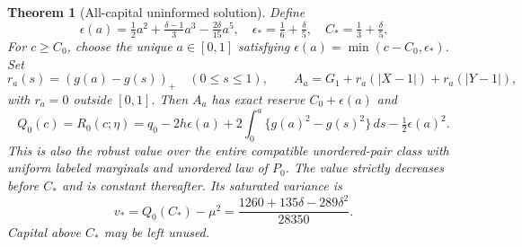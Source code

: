 \documentclass[11pt,a4paper]{amsart}
\theoremstyle{plain}
\newtheorem{theorem}{Theorem}[section]
\theoremstyle{definition}
\theoremstyle{remark}
\begin{document}
\begin{theorem}[All-capital uninformed solution]\label{thm:allcapital}
Define
\begin{equation}\label{eq:aparam}
 \epsilon(a)=\tfrac12a^2+\tfrac{\delta-1}{3}a^3-\tfrac{2\delta}{15}a^5,
 \quad \epsilon_* =\tfrac16+\tfrac\delta5,
 \quad C_* =\tfrac13+\tfrac\delta5.
\end{equation}
For $c\ge C_0$, choose the unique $a\in[0,1]$ satisfying
$\epsilon(a)=\min(c-C_0,\epsilon_*)$. Set
\begin{equation}\label{eq:obstaclebook}
 r_a(s)=(g(a)-g(s))_+\quad(0\le s\le1),\qquad
 A_a=G_1+r_a(|X-1|)+r_a(|Y-1|),
\end{equation}
with $r_a=0$ outside $[0,1]$. Then $A_a$ has exact reserve $C_0+\epsilon(a)$ and
\begin{equation}\label{eq:exactuninformed}
 Q_0(c)=R_0(c;\eta)=q_0-2h\epsilon(a)
 +2\int_0^a\{g(a)^2-g(s)^2\}\,ds-\tfrac12\epsilon(a)^2.
\end{equation}
This is also the robust value over the entire compatible unordered-pair class with uniform labeled marginals and unordered law of $P_0$. The value strictly decreases before $C_*$ and is constant thereafter. Its saturated variance is
\begin{equation}\label{eq:vstar}
 v_* =Q_0(C_*)-\mu^2
 =\frac{1260+135\delta-289\delta^2}{28350}.
\end{equation}
Capital above $C_*$ may be left unused.
\end{theorem}
\end{document}
